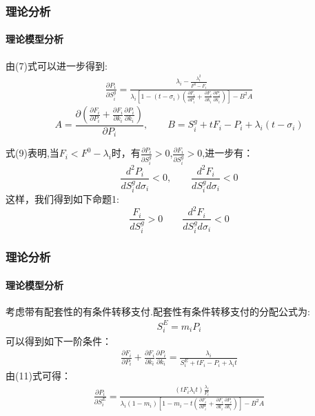 
\begin{frame}[t]
	\frametitle{理论分析}
	\framesubtitle{理论模型分析}
	\begin{small}
	由(7)式可以进一步得到:
		\begin{align}
		\frac{\partial P_i}{\partial S_i^g}= \frac{\lambda_i-\frac{\lambda_i^2}{F^0-F_i}}
		{\lambda_i [1-(t-\sigma_i)\left(\frac{\partial F_i}{\partial P_i}+\frac{\partial F_i}{\partial k_i} \frac{\partial P_i}{\partial k_i}\right)]-B^2A}
		\end{align}
		\[
		A=\frac{\partial (\frac{\partial F_i}{\partial P_i}+\frac{\partial F_i}{\partial k_i} \frac{\partial P_i}{\partial k_i})}{\partial P_i},\qquad
		B=S_i^g+tF_i-P_i+\lambda_i(t-\sigma_i)
		\]
		
		式(9)表明,当$F_i<F^0-\lambda_i$时，有$\frac{\partial P_i}{\partial S_i^g}>0$,$\frac{\partial F_i}{\partial S_i^g}>0$,进一步有：\[
		\frac{d^2P_i}{dS_i^g d\sigma_i}<0,\qquad
		\frac{d^2F_i}{dS_i^g d\sigma_i}<0
		\]
		这样，我们得到如下命题1:
		\[
		\frac{F_i}{dS_i^g}>0 \qquad
		\frac{d^2F_i}{dS_i^g d\sigma_i}<0
		\]
	\end{small}
\end{frame}


\begin{frame}[t]
	\frametitle{理论分析}
	\framesubtitle{理论模型分析}
	\begin{small}
		考虑带有配套性的有条件转移支付.配套性有条件转移支付的分配公式为:
		\begin{align}
		S_i^E = m_iP_i
		\end{align}
		可以得到如下一阶条件：
		\begin{align}
		\frac{\partial F_i}{\partial P_i}+\frac{\partial F_i}{\partial k_i} \frac{\partial P_i}{\partial k_i} =\frac{\lambda_i}{S_i^E+tF_i-P_i+\lambda_it}
		\end{align}
		由(11)式可得：
		\begin{align}
		\frac{\partial P_i}{\partial S_i^E}= \frac{(tF_i\lambda_it)\frac{\lambda_i}{P_i}}
		{\lambda_i(1-m_i) [1-m_i-t\left(\frac{\partial F_i}{\partial P_i}+\frac{\partial F_i}{\partial k_i} \frac{\partial P_i}{\partial k_i}\right)]-B^2A}
		\end{align}		

	\end{small}
\end{frame}

